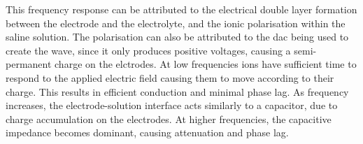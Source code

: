 This frequency response can be attributed to the electrical double layer formation between the electrode and the electrolyte, and the ionic polarisation within the saline solution.
The polarisation can also be attributed to the \gls{dac} being used to create the wave, since it only produces positive voltages, causing a semi-permanent charge on the elctrodes.
At low frequencies ions have sufficient time to respond to the applied electric field causing them to move according to their charge.
This results in efficient conduction and minimal phase lag.
As frequency increases, the electrode-solution interface acts similarly to a capacitor, due to charge accumulation on the electrodes.
At higher frequencies, the capacitive impedance becomes dominant, causing attenuation and phase lag.

